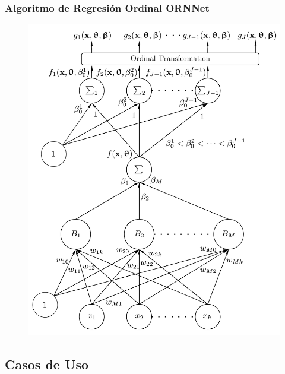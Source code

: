 \documentclass[compress,allowframebreaks]{beamer}
\begin{document}
			\begin{frame}
				\frametitle{\normalsize Algoritmo de Regresión Ordinal ORNNet}
				
				\begin{figure}[h]
					\centering
					\includegraphics[scale=0.3]{img/ORNNet.pdf}
				\end{figure}
			\end{frame}

		\subsection{Casos de Uso}
\end{document}
